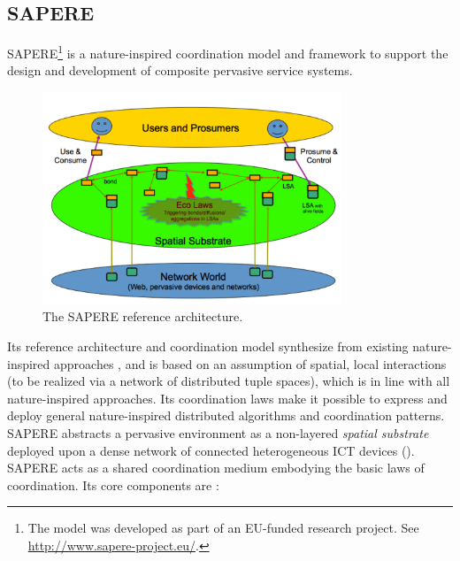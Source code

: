 \documentclass[12pt,a4paper,twoside,openright]{book}
\begin{document}
\subsection{SAPERE}
\label{sapere}
SAPERE\footnote{The model was developed as part of an EU-funded research project. See \url{http://www.sapere-project.eu/}.} \cite{sapere-procedia7} is a nature-inspired coordination model and framework to support the design and development of composite pervasive service systems.
\begin{figure}
\centering
\includegraphics[width=0.8\textwidth]{img/architecture_2.pdf}
\caption[SAPERE reference architecture]{The SAPERE reference architecture.}
\label{img:sapere-architecture}
\end{figure}
%
Its reference architecture and coordination model synthesize from existing nature-inspired approaches \cite{biochemicalTupleSpaces, frameworkSelfOrg, VCMZ-TAAS2011, wordNet}, and is based on an assumption of spatial, local interactions (to be realized via a network of distributed tuple spaces), which is in line with all nature-inspired approaches.
%
Its coordination laws make it possible to express and deploy general nature-inspired distributed algorithms and coordination patterns.
%
SAPERE abstracts a pervasive environment as a non-layered \emph{spatial substrate} deployed upon a dense network of connected heterogeneous ICT devices ().
%
SAPERE acts as a shared coordination medium embodying the basic laws of coordination.
%
Its core components are \cite{sapereecolaws-sac2012}:
\end{document}
